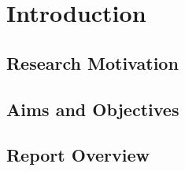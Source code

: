 \chapter{Introduction}

\section{Research Motivation}

\section{Aims and Objectives}

\section{Report Overview}